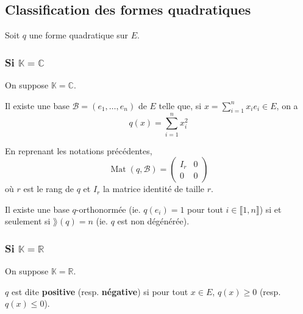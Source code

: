   \subsection{Classification des formes quadratiques}

  Soit $q$ une forme quadratique sur $E$.

  \subsubsection{Si \texorpdfstring{$\mathbb{K} = \mathbb{C}$}{K = C}}

  On suppose $\mathbb{K} = \mathbb{C}$.


  \begin{theorem}
    Il existe une base $\mathcal{B} = (e_1, \dots, e_n)$ de $E$ telle que, si $x = \sum_{i=1}^n x_i e_i \in E$, on a
    \[ q(x) = \sum_{i=1}^n x_i^2 \]
  \end{theorem}

  \begin{remark}
    En reprenant les notations précédentes,
    \[
      \operatorname{Mat}(q, \mathcal{B}) =
      \begin{pmatrix}
        I_r & 0 \\
        0 & 0
      \end{pmatrix}
    \]
    où $r$ est le rang de $q$ et $I_r$ la matrice identité de taille $r$.
  \end{remark}

  \begin{corollary}
    Il existe une base $q$-orthonormée (ie. $q(e_i) = 1$ pour tout $i \in \llbracket 1, n \rrbracket$) si et seulement si $\rang(q) = n$ (ie. $q$ est non dégénérée).
  \end{corollary}

  \subsubsection{Si \texorpdfstring{$\mathbb{K} = \mathbb{R}$}{K = R}}

  On suppose $\mathbb{K} = \mathbb{R}$.


  \begin{definition}
    $q$ est dite \textbf{positive} (resp. \textbf{négative}) si pour tout $x \in E$, $q(x) \geq 0$ (resp. $q(x) \leq 0$).
  \end{definition}

